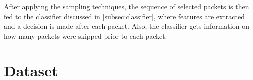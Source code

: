 \documentclass[conference]{IEEEtran}
\newcommand\note[2]{{\color{#1}#2}}
\begin{document}
After applying the sampling techniques, the sequence of selected packets is then fed to the classifier discussed in \autoref{subsec:classifier}, where features are extracted and a decision is made after each packet. Also, the classifier gets information on how many packets were skipped prior to each packet.


\section{Dataset}

\end{document}
